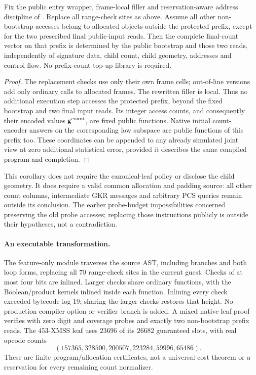 \begin{corollary}\label{cor:zk-range-free-prefix}
Fix the public entry wrapper, frame-local filler and reservation-aware address discipline of . Replace all range-check sites as above. Assume all other non-bootstrap accesses belong to allocated objects outside the protected prefix, except for the two prescribed final public-input reads. Then the complete final-count vector on that prefix is determined by the public bootstrap and those two reads, independently of signature data, child count, child geometry, addresses and control flow. No prefix-count top-up library is required.
\end{corollary}
\begin{proof}
The replacement checks use only their own frame cells; out-of-line versions add only ordinary calls to allocated frames. The rewritten filler is local. Thus no additional execution step accesses the protected prefix, beyond the fixed bootstrap and two final input reads. Its integer access counts, and consequently their encoded values $\mathsf{g}^{\mathrm{count}}$, are fixed public functions. Native initial count-encoder answers on the corresponding low subspace are public functions of this prefix too. These coordinates can be appended to any already simulated joint view at zero additional statistical error, provided it describes the same compiled program and completion.
\end{proof}

This corollary does not require the canonical-leaf policy or disclose the child geometry. It does require a valid common allocation and padding source: all other count columns, intermediate GKR messages and arbitrary PCS queries remain outside its conclusion. The earlier probe-budget impossibilities concerned preserving the old probe accesses; replacing those instructions publicly is outside their hypotheses, not a contradiction.

\paragraph{An executable transformation.} The feature-only module  traverses the source AST, including branches and both loop forms, replacing all $70$ range-check sites in the current guest. Checks of at most four bits are inlined. Larger checks share ordinary functions, with the Boolean/product kernels inlined inside each function. Inlining every check exceeded bytecode log $19$; sharing the larger checks restores that height. No production compiler option or verifier branch is added. A mixed native leaf proof verifies with zero digit and coverage probes and exactly two non-bootstrap prefix reads. The $453$-XMSS leaf uses $23696$ of its $26682$ guaranteed slots, with real opcode counts
\[
 (157365,328500,200507,223284,59996,65486).
\]
These are finite program/allocation certificates, not a universal cost theorem or a reservation for every remaining count normalizer.

